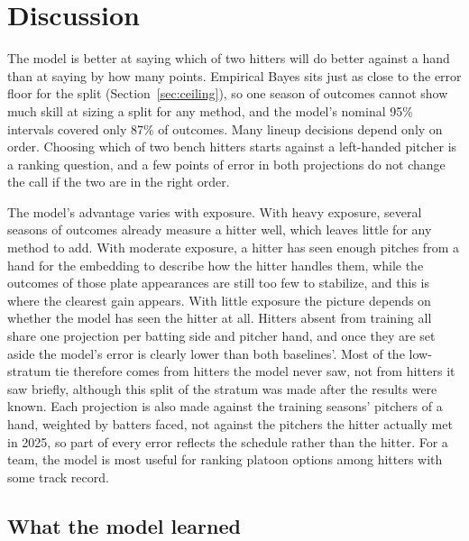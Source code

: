 \section{Discussion}
\label{sec:discussion}\label{sec:ordering}

The model is better at saying which of two hitters will do better against a hand than at saying by how many points. Empirical Bayes sits just as close to the error floor for the split (Section~\ref{sec:ceiling}), so one season of outcomes cannot show much skill at sizing a split for any method, and the model's nominal 95\% intervals covered only 87\% of outcomes. Many lineup decisions depend only on order. Choosing which of two bench hitters starts against a left-handed pitcher is a ranking question, and a few points of error in both projections do not change the call if the two are in the right order.

The model's advantage varies with exposure. With heavy exposure, several seasons of outcomes already measure a hitter well, which leaves little for any method to add. With moderate exposure, a hitter has seen enough pitches from a hand for the embedding to describe how the hitter handles them, while the outcomes of those plate appearances are still too few to stabilize, and this is where the clearest gain appears. With little exposure the picture depends on whether the model has seen the hitter at all. Hitters absent from training all share one projection per batting side and pitcher hand, and once they are set aside the model's error is clearly lower than both baselines'. Most of the low-stratum tie therefore comes from hitters the model never saw, not from hitters it saw briefly, although this split of the stratum was made after the results were known. Each projection is also made against the training seasons' pitchers of a hand, weighted by batters faced, not against the pitchers the hitter actually met in 2025, so part of every error reflects the schedule rather than the hitter. For a team, the model is most useful for ranking platoon options among hitters with some track record.

\subsection{What the model learned}
\label{sec:embedding}

